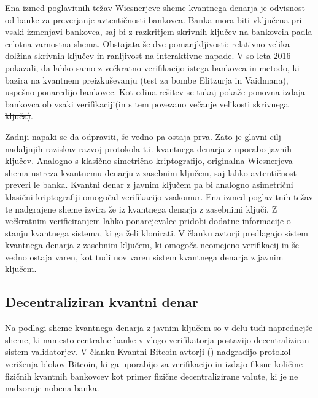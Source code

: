 \documentclass[12pt]{article}
\providecommand{\DIFadd}[1]{{\protect\color{blue}\uwave{#1}}} %
\providecommand{\DIFdel}[1]{{\protect\color{red}\sout{#1}}}                      %
\providecommand{\DIFaddbegin}{} %
\providecommand{\DIFaddend}{} %
\providecommand{\DIFdelbegin}{} %
\providecommand{\DIFdelend}{} %
\newcommand{\DIFscaledelfig}{0.5}
\newlength{\DIFdelgraphicswidth} %
\newlength{\DIFdelgraphicsheight} %
\newcommand{\DIFaddincludegraphics}[2][]{{\color{blue}\fbox{\DIFOincludegraphics[#1]{#2}}}} %
\newcommand{\DIFdelincludegraphics}[2][]{%
\sbox{\DIFdelgraphicsbox}{\DIFOincludegraphics[#1]{#2}}%
\settoboxwidth{\DIFdelgraphicswidth}{\DIFdelgraphicsbox} %
\settoboxtotalheight{\DIFdelgraphicsheight}{\DIFdelgraphicsbox} %
\scalebox{\DIFscaledelfig}{%
\parbox[b]{\DIFdelgraphicswidth}{\usebox{\DIFdelgraphicsbox}\\[-\baselineskip] \rule{\DIFdelgraphicswidth}{0em}}\llap{\resizebox{\DIFdelgraphicswidth}{\DIFdelgraphicsheight}{%
\setlength{\unitlength}{\DIFdelgraphicswidth}%
\begin{picture}(1,1)%
\thicklines\linethickness{2pt} %
{\color[rgb]{1,0,0}\put(0,0){\framebox(1,1){}}}%
{\color[rgb]{1,0,0}\put(0,0){\line( 1,1){1}}}%
{\color[rgb]{1,0,0}\put(0,1){\line(1,-1){1}}}%
\end{picture}%
}\hspace*{3pt}}} %
} %
\DeclareRobustCommand{\DIFaddbegin}{\DIFOaddbegin \let\includegraphics\DIFaddincludegraphics} %
\DeclareRobustCommand{\DIFaddend}{\DIFOaddend \let\includegraphics\DIFOincludegraphics} %
\DeclareRobustCommand{\DIFdelbegin}{\DIFOdelbegin \let\includegraphics\DIFdelincludegraphics} %
\DeclareRobustCommand{\DIFdelend}{\DIFOaddend \let\includegraphics\DIFOincludegraphics} %
\begin{document}
Ena izmed poglavitnih težav Wiesnerjeve sheme kvantnega denarja je odvisnost od banke za preverjanje avtentičnosti bankovca. Banka mora biti vključena pri vsaki izmenjavi bankovca, saj bi z razkritjem skrivnih ključev na bankovcih padla celotna varnostna shema. Obstajata še dve pomanjkljivosti: relativno velika dolžina skrivnih ključev in ranljivost na interaktivne napade. V \cite{brodutchAdaptiveAttackWiesner2016} so leta 2016 \DIFaddbegin \DIFadd{namreč }\DIFaddend pokazali, da lahko samo z večkratno verifikacijo istega bankovca in metodo, ki bazira na kvantnem \DIFdelbegin \DIFdel{preizkuševanju }\DIFdelend \DIFaddbegin \DIFadd{preizkušanju }\DIFaddend (test za bombe Elitzurja in Vaidmana), uspešno ponaredijo bankovec. Kot edina rešitev se tukaj pokaže ponovna izdaja bankovca ob vsaki verifikaciji\DIFdelbegin \DIFdel{(in s tem povezano večanje velikosti skrivnega ključa)}\DIFdelend .
\par Zadnji napaki se da odpraviti, še vedno pa ostaja prva. Zato je glavni cilj nadaljnjih raziskav razvoj protokola t.i. kvantnega denarja z uporabo javnih ključev. Analogno s klasično simetrično kriptografijo, originalna Wiesnerjeva shema ustreza kvantnemu denarju z zasebnim ključem, saj lahko avtentičnost preveri le banka. Kvantni denar z javnim ključem pa bi analogno asimetrični klasični kriptografiji omogočal verifikacijo vsakomur. Ena izmed poglavitnih težav te nadgrajene sheme izvira že iz kvantnega denarja z zasebnimi ključi. Z večkratnim verificiranjem lahko ponarejevalec pridobi dodatne informacije o stanju kvantnega sistema, ki ga želi klonirati. V članku \cite{aaronsonQuantumMoneyHidden2012} avtorji predlagajo sistem kvantnega denarja z zasebnim ključem, ki omogoča neomejeno verifikacij in še vedno ostaja varen, kot tudi nov varen sistem kvantnega denarja z javnim ključem. 

\subsection{Decentraliziran kvantni denar}

Na podlagi sheme kvantnega denarja z javnim ključem \cite{aaronsonQuantumMoneyHidden2012} so v delu tudi naprednejše sheme, ki namesto centralne banke v vlogo verifikatorja postavijo decentraliziran sistem validatorjev. V članku Kvantni Bitcoin avtorji (\cite{jogenforsQuantumBitcoinAnonymous2019}) nadgradijo protokol veriženja blokov Bitcoin, ki ga uporabijo za verifikacijo in izdajo fiksne količine fizičnih kvantnih bankovcev kot primer fizične decentralizirane valute, ki je ne nadzoruje nobena banka. 
\end{document}
